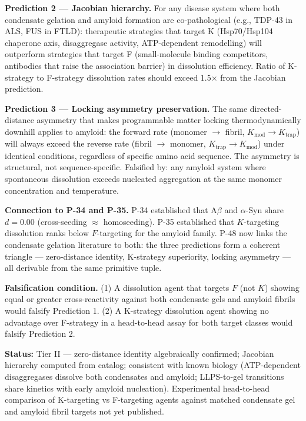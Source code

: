 \documentclass[12pt,a4paper]{article}
\begin{document}
\textbf{Prediction 2 --- Jacobian hierarchy.} For any disease system where both condensate gelation and amyloid formation are co-pathological (e.g., TDP-43 in ALS, FUS in FTLD): therapeutic strategies that target K (Hsp70/Hsp104 chaperone axis, disaggregase activity, ATP-dependent remodelling) will outperform strategies that target F (small-molecule binding competitors, antibodies that raise the association barrier) in dissolution efficiency. Ratio of K-strategy to F-strategy dissolution rates should exceed 1.5$\times$ from the Jacobian prediction.

\textbf{Prediction 3 --- Locking asymmetry preservation.} The same directed-distance asymmetry that makes programmable matter locking thermodynamically downhill applies to amyloid: the forward rate (monomer $\rightarrow$ fibril, $K_\text{mod} \to K_\text{trap}$) will always exceed the reverse rate (fibril $\rightarrow$ monomer, $K_\text{trap} \to K_\text{mod}$) under identical conditions, regardless of specific amino acid sequence. The asymmetry is structural, not sequence-specific. Falsified by: any amyloid system where spontaneous dissolution exceeds nucleated aggregation at the same monomer concentration and temperature.

\textbf{Connection to P-34 and P-35.} P-34 established that A$\beta$ and $\alpha$-Syn share $d = 0.00$ (cross-seeding $\approx$ homoseeding). P-35 established that $K$-targeting dissolution ranks below $F$-targeting for the amyloid family. P-48 now links the condensate gelation literature to both: the three predictions form a coherent triangle --- zero-distance identity, K-strategy superiority, locking asymmetry --- all derivable from the same primitive tuple.

\textbf{Falsification condition.} (1) A dissolution agent that targets $F$ (not $K$) showing equal or greater cross-reactivity against both condensate gels and amyloid fibrils would falsify Prediction 1. (2) A K-strategy dissolution agent showing no advantage over F-strategy in a head-to-head assay for both target classes would falsify Prediction 2.

\textbf{Status:} Tier II --- zero-distance identity algebraically confirmed; Jacobian hierarchy computed from catalog; consistent with known biology (ATP-dependent disaggregases dissolve both condensates and amyloid; LLPS-to-gel transitions share kinetics with early amyloid nucleation). Experimental head-to-head comparison of K-targeting vs F-targeting agents against matched condensate gel and amyloid fibril targets not yet published.
\end{document}
